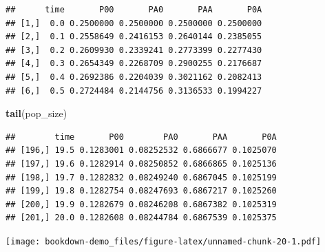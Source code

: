 \documentclass[
]{book}
\newenvironment{Shaded}{\begin{snugshade}}{\end{snugshade}}
\newcommand{\CommentTok}[1]{\textcolor[rgb]{0.56,0.35,0.01}{\textit{#1}}}
\newcommand{\DataTypeTok}[1]{\textcolor[rgb]{0.13,0.29,0.53}{#1}}
\newcommand{\FloatTok}[1]{\textcolor[rgb]{0.00,0.00,0.81}{#1}}
\newcommand{\KeywordTok}[1]{\textcolor[rgb]{0.13,0.29,0.53}{\textbf{#1}}}
\newcommand{\NormalTok}[1]{#1}
\newcommand{\OperatorTok}[1]{\textcolor[rgb]{0.81,0.36,0.00}{\textbf{#1}}}
\newcommand{\StringTok}[1]{\textcolor[rgb]{0.31,0.60,0.02}{#1}}
\begin{document}
\begin{verbatim}
##      time       P00       PA0       PAA       P0A
## [1,]  0.0 0.2500000 0.2500000 0.2500000 0.2500000
## [2,]  0.1 0.2558649 0.2416153 0.2640144 0.2385055
## [3,]  0.2 0.2609930 0.2339241 0.2773399 0.2277430
## [4,]  0.3 0.2654349 0.2268709 0.2900255 0.2176687
## [5,]  0.4 0.2692386 0.2204039 0.3021162 0.2082413
## [6,]  0.5 0.2724484 0.2144756 0.3136533 0.1994227
\end{verbatim}

\begin{Shaded}
\begin{Highlighting}[]
\KeywordTok{tail}\NormalTok{(pop_size)}
\end{Highlighting}
\end{Shaded}

\begin{verbatim}
##        time       P00        PA0       PAA       P0A
## [196,] 19.5 0.1283001 0.08252532 0.6866677 0.1025070
## [197,] 19.6 0.1282914 0.08250852 0.6866865 0.1025136
## [198,] 19.7 0.1282832 0.08249240 0.6867045 0.1025199
## [199,] 19.8 0.1282754 0.08247693 0.6867217 0.1025260
## [200,] 19.9 0.1282679 0.08246208 0.6867382 0.1025319
## [201,] 20.0 0.1282608 0.08244784 0.6867539 0.1025375
\end{verbatim}

\begin{Shaded}
\end{Shaded}

\texttt{[image: bookdown-demo\_files/figure-latex/unnamed-chunk-20-1.pdf]}
\end{document}
